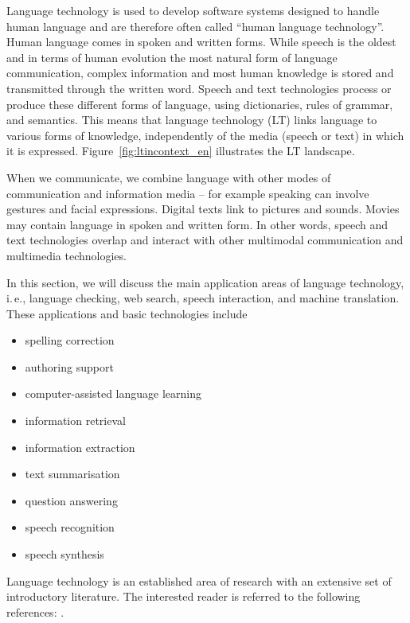 \begin{multicols}{2}
Language technology is used to develop software systems designed to handle human language and are therefore often called “human language technology”. Human language comes in spoken and written forms. While speech is the oldest and in terms of human evolution the most natural form of language communication, complex information and most human knowledge is stored and transmitted through the written word. Speech and text technologies process or produce these different forms of language, using dictionaries, rules of grammar, and semantics. This means that language technology (LT) links language to various forms of knowledge, independently of the media (speech or text) in which it is expressed. Figure~\ref{fig:ltincontext_en} illustrates the LT landscape.

When we communicate, we combine language with other modes of communication and information media – for example speaking can involve gestures and facial expressions. Digital texts link to pictures and sounds. Movies may contain language in spoken and written form. In other words, speech and text technologies overlap and interact with other multimodal communication and multimedia technologies.

In this section, we will discuss the main application areas of language technology, i.\,e., language checking, web search, speech interaction, and machine translation. These applications and basic technologies include 

\begin{itemize}
\item spelling correction
\item authoring support
\item computer-assisted language learning
\item information retrieval 
\item information extraction
\item text summarisation
\item question answering
\item speech recognition 
\item speech synthesis 
\end{itemize}

Language technology is an established area of research with an extensive set of introductory literature. The interested reader is referred to the following references:  \cite{carstensen-etal1, jurafsky-martin01, manning-schuetze1, lt-world1, lt-survey1}.


\end{multicols}
